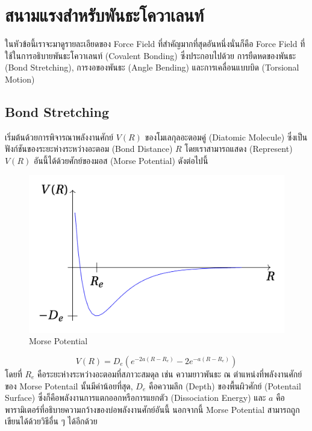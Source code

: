\section{สนามแรงสำหรับพันธะโควาเลนท์}
\label{sec:md_ff_covalent_bond}

ในหัวข้อนี้เราจะมาดูรายละเอียดของ Force Field ที่สำคัญมากที่สุดอันหนึ่งนั่นก็คือ Force Field ที่ใช้ในการอธิบายพันธะโควาเลนท์ (Covalent Bonding) ซึ่งประกอบไปด้วย การยืดหดของพันธะ (Bond Stretching), การงอของพันธะ (Angle Bending) และการเคลื่อนแบบบิด (Torsional Motion)

\subsection{Bond Stretching}

เริ่มต้นด้วยการพิจารณาพลังงานศักย์ $V(R)$ ของโมเลกุลอะตอมคู่ (Diatomic Molecule) ซึ่งเป็นฟังก์ชันของระยะห่างระหว่างอะตอม (Bond Distance) $R$ โดยเราสามารถแสดง (Represent) $V(R)$ อันนี้ได้ด้วยศักย์ของมอส (Morse Potential) ดังต่อไปนี้

\begin{figure}[H]
  \centering
  \includegraphics[width=0.8\linewidth]{fig/morse-potential.png}
  \caption{Morse Potential}
  \label{fig:morse_potential}
\end{figure}

\begin{equation}
  \label{eq:potential_bond_stretch}
  V(R) = D_{e} \left( e^{-2a(R-R_{e})} -2e^{-a(R-R_{e})} \right)
\end{equation}
%
โดยที่ $R_{e}$ คือระยะห่างระหว่างอะตอมที่สภาวะสมดุล เช่น ความยาวพันธะ ณ ตำแหน่งที่พลังงานศักย์ของ Morse Potentail นั้นมีค่าน้อยที่สุด, $D_{e}$ คือความลึก (Depth) ของพื้นผิวศักย์ (Potentail Surface) ซึ่งก็คือพลังงานการแตกออกหรือการแยกตัว (Dissociation Energy) และ $a$ คือพารามิเตอร์ที่อธิบายความกว้างของบ่อพลังงานศักย์อันนี้ นอกจากนี้ Morse Potential สามารถถูกเขียนได้ด้วยวิธีอื่น ๆ ได้อีกด้วย


